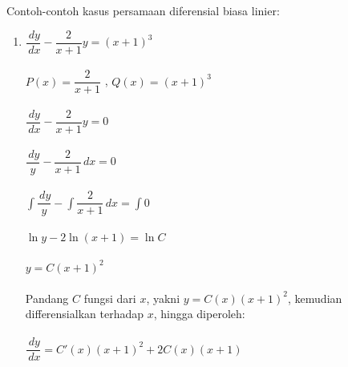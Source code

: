 Contoh-contoh kasus persamaan diferensial biasa linier:

\begin{enumerate}[1.]

	\item \begin{math} \dfrac{\, dy}{\, dx} - \dfrac{2}{x + 1} y = (x + 1)^{3} \end{math} \\ \\
	\begin{math} P(x) = \dfrac{2}{x + 1} \end{math} , \begin{math} Q(x) = (x + 1)^{3} \end{math} \\ \\
	\begin{math} \dfrac{\, dy}{\, dx} - \dfrac{2}{x + 1} y = 0 \end{math} \\ \\
	\begin{math} \dfrac{\, dy}{y} - \dfrac{2}{x + 1} \, dx = 0 \end{math} \\ \\
	\begin{math} \int  \dfrac{\, dy}{y} - \int \dfrac{2}{x + 1} \, dx = \int 0 \end{math} \\ \\
	\begin{math} \ln y - 2 \ln(x + 1) = \ln C \end{math} \\ \\
	\begin{math} y = C(x + 1)^{2} \end{math} \\ \\
	Pandang \begin{math} C \end{math} fungsi dari \begin{math} x \end{math}, yakni \begin{math} y = C(x)(x + 1)^{2} \end{math}, kemudian differensialkan terhadap \begin{math} x \end{math}, hingga diperoleh: \\ \\
	\begin{math}\dfrac{\, dy}{\, dx} = C'(x)(x + 1)^{2} +2C(x)(x + 1) \end{math} \\ \\

\end{enumerate}
